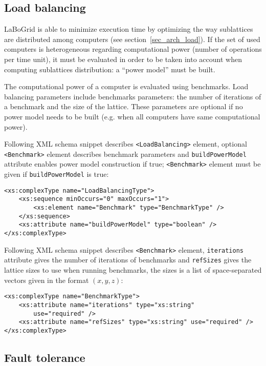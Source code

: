 \subsection{Load balancing}
\label{sec_conf_middle_load}

LaBoGrid is able to minimize execution time by optimizing the way sublattices
are distributed among computers (see section~\ref{sec_arch_load}). If the set
of used computers is heterogeneous regarding computational power (number of
operations per time unit), it must be evaluated in order to be taken into
account when computing sublattices distribution: a ``power model'' must be built.

The computational power of a computer is evaluated using benchmarks. Load
balancing parameters include benchmarks parameters: the number of iterations of
a benchmark and the size of the lattice. These parameters are optional if no
power model needs to be built (e.g. when all computers have same computational
power).

Following XML schema snippet describes \verb|<LoadBalancing>| element,
optional \verb|<Benchmark>| element describes benchmark parameters and
\texttt{buildPowerModel} attribute enables power model construction if true;
\verb|<Benchmark>| element must be given if \texttt{buildPowerModel} is true:

\begin{Verbatim}[tabsize=2,frame=lines]
<xs:complexType name="LoadBalancingType">
	<xs:sequence minOccurs="0" maxOccurs="1">
		<xs:element name="Benchmark" type="BenchmarkType" />
	</xs:sequence>
	<xs:attribute name="buildPowerModel" type="boolean" />
</xs:complexType>
\end{Verbatim}

Following XML schema snippet describes \verb|<Benchmark>| element,
\texttt{iterations} attribute gives the number of iterations of benchmarks and
\texttt{refSizes} gives the lattice sizes to use when running benchmarks, the
sizes is a list of space-separated vectors given in the format $(x,y,z)$:

\begin{Verbatim}[tabsize=2,frame=lines]
<xs:complexType name="BenchmarkType">
	<xs:attribute name="iterations" type="xs:string"
		use="required" />
	<xs:attribute name="refSizes" type="xs:string" use="required" />
</xs:complexType>
\end{Verbatim}


\subsection{Fault tolerance}
\label{sec_conf_middle_fault}

